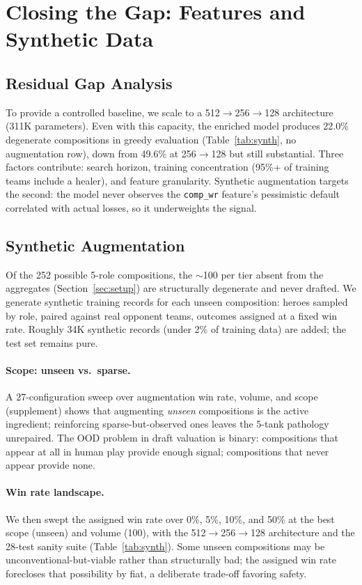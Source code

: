 \documentclass[journal]{IEEEtran}
\begin{document}
\section{Closing the Gap: Features and Synthetic Data}
\label{sec:repair}

\subsection{Residual Gap Analysis}

To provide a controlled baseline, we scale to a 512$\to$256$\to$128 architecture (311K parameters). Even with this capacity, the enriched model produces 22.0\% degenerate compositions in greedy evaluation (Table~\ref{tab:synth}, no augmentation row), down from 49.6\% at 256$\to$128 but still substantial. Three factors contribute: search horizon, training concentration (95\%+ of training teams include a healer), and feature granularity. Synthetic augmentation targets the second: the model never observes the \texttt{comp\_wr} feature's pessimistic default correlated with actual losses, so it underweights the signal.

\subsection{Synthetic Augmentation}

Of the 252 possible 5-role compositions, the $\sim$100 per tier absent from the aggregates (Section~\ref{sec:setup}) are structurally degenerate and never drafted. We generate synthetic training records for each unseen composition: heroes sampled by role, paired against real opponent teams, outcomes assigned at a fixed win rate. Roughly 34K synthetic records (under 2\% of training data) are added; the test set remains pure.

\paragraph{Scope: unseen vs.\ sparse.} A 27-configuration sweep over augmentation win rate, volume, and scope (supplement) shows that augmenting \textit{unseen} compositions is the active ingredient; reinforcing sparse-but-observed ones leaves the 5-tank pathology unrepaired. The OOD problem in draft valuation is binary: compositions that appear at all in human play provide enough signal; compositions that never appear provide none.

\paragraph{Win rate landscape.} We then swept the assigned win rate over 0\%, 5\%, 10\%, and 50\% at the best scope (unseen) and volume (100), with the 512$\to$256$\to$128 architecture and the 28-test sanity suite (Table~\ref{tab:synth}). Some unseen compositions may be unconventional-but-viable rather than structurally bad; the assigned win rate forecloses that possibility by fiat, a deliberate trade-off favoring safety.
\end{document}
